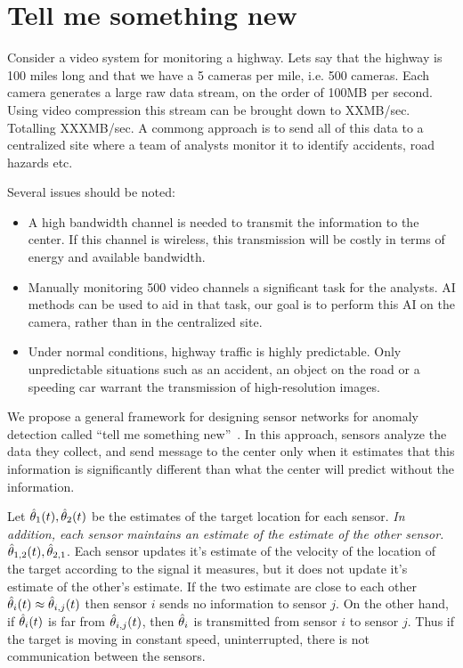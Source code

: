 \section{Tell me something new}

Consider a video system for monitoring a highway. Lets say that the
highway is 100 miles long and that we have a 5 cameras per mile,
i.e. 500 cameras. Each camera generates a large raw data stream, on
the order of 100MB per second. Using video compression this stream can
be brought down to XXMB/sec. Totalling XXXMB/sec. A commong approach
is to send all of this data to a centralized site where a team of
analysts monitor it to identify accidents, road hazards etc.

Several issues should be noted:
\begin{itemize}
\item A high bandwidth channel is needed to transmit the information
  to the center. If this channel is wireless, this transmission will
  be costly in terms of energy and available bandwidth.
\item Manually monitoring 500 video channels a significant task for
  the analysts. AI methods can be used to aid in that task, our goal
  is to perform this AI on the camera, rather than in the centralized
  site.
\item Under normal conditions, highway traffic is highly
  predictable. Only unpredictable situations such as an accident, an
  object on the road or a speeding car warrant the transmission of
  high-resolution images.
\end{itemize}

We propose a general framework for designing sensor networks for
anomaly detection called ``tell me something new''~\cite{TMSN}. In
this approach, sensors analyze the data they collect, and send message
to the center only when it estimates that this information is
significantly different than what the center will predict without the
information.

Let $\hat{\theta}_1(t),\hat{\theta}_2(t)$ be the estimates of the target
location for each sensor. {\em In addition, each sensor maintains an
  estimate of the estimate of the other sensor.}
$\hat{\theta}_{1,2}(t),\hat{\theta}_{2,1}$. Each sensor updates it's estimate of
the velocity of the location of the target according to the signal it
measures, but it does not update it's estimate of the other's
estimate.  If the two estimate are close to each other $\hat{\theta}_i(t)
\approx \hat{\theta}_{i,j}(t)$ then sensor $i$ sends no information to
sensor $j$. On the other hand, if $\hat{\theta}_i(t)$ is far from
$\hat{\theta}_{i,j}(t)$, then $\hat{\theta}_{i}$ is transmitted from sensor $i$
to sensor $j$. Thus if the target is moving in constant speed,
uninterrupted, there is not communication between the sensors.

